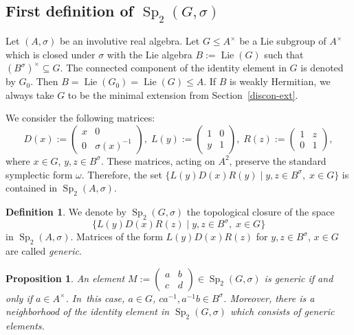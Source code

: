 \documentclass[a4paper,oneside,11pt]{amsart}
\DeclareMathOperator{\Sp}{Sp}
\DeclareMathOperator{\Lie}{Lie}
\theoremstyle{plain}
\newtheorem{prop}[teo]{Proposition}
\theoremstyle{definition}
\newtheorem{df}[teo]{Definition}
\theoremstyle{remark}
\newcommand{\defin}{\emph}
\begin{document}
\subsection{First definition of \texorpdfstring{$\Sp_2(G,\sigma)$}{Sp2(G,sigma)}}

Let $(A,\sigma)$ be an involutive real algebra. Let $G\leq A^\times$ be a Lie subgroup of $A^\times$ which is closed under $\sigma$ with the Lie algebra $B:=\Lie(G)$ such that $(B^{\sigma})^\times\subseteq G$. The connected component of the identity element in $G$ is denoted by $G_0$. Then $B=\Lie(G_0)=\Lie(G)\leq A$. If $B$ is weakly Hermitian, we always take $G$ to be the minimal extension from Section~\ref{discon-ext}.


We consider the following matrices:
\begin{equation}\label{eq:sp_2-generators}
D(x):=\begin{pmatrix}
    x & 0 \\
    0 & \sigma(x)^{-1}
    \end{pmatrix},\;
L(y):=\begin{pmatrix}
    1 & 0 \\
    y & 1
    \end{pmatrix},\;
R(z):=\begin{pmatrix}
    1 & z \\
    0 & 1
    \end{pmatrix},
\end{equation}
where $x\in G$, $y,z\in B^{\sigma}$. These matrices, acting on $A^2$, preserve the standard symplectic form
$\omega$. Therefore, the set $\{L(y)D(x)R(y)\mid y,z\in B^{\sigma},\;x\in G\}$ is contained in $\Sp_2(A,\sigma)$.

\begin{df} We denote by $\Sp_2(G,\sigma)$ the topological closure of the space 
$$\{L(y)D(x)R(z)\mid y,z\in B^{\sigma},\;x\in G\}$$
in $\Sp_2(A,\sigma)$. Matrices of the form $L(y)D(x)R(z)$ for $y,z\in B^{\sigma}$, $x\in G$ are called \defin{generic}.
\end{df}

\begin{prop}\label{prop:generic.elements}
    An element $M:=\begin{pmatrix}
        a & b \\
        c & d
    \end{pmatrix}\in\Sp_2(G,\sigma)$ is generic if and only if $a\in A^\times$. In~this case, $a\in G$, $ca^{-1},a^{-1}b\in B^\sigma$. Moreover, there is a neighborhood of the identity element in $\Sp_2(G,\sigma)$ which consists of generic elements.
\end{prop}
\end{document}

